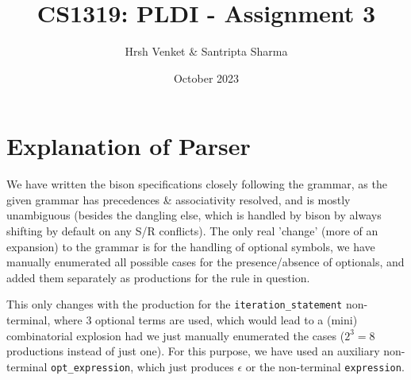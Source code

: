 \documentclass{article}
\title{CS1319: PLDI - Assignment 3}
\author{Hrsh Venket \& Santripta Sharma}
\date{October 2023}
\begin{document}
\maketitle 


\section*{Explanation of Parser}
We have written the bison specifications closely following the grammar, as the given grammar has precedences \& associativity resolved, and is mostly unambiguous (besides the dangling else, which is handled by bison by always shifting by default on any S/R conflicts). The only real 'change' (more of an expansion) to the grammar is for the handling of optional symbols, we have manually enumerated all possible cases for the presence/absence of optionals, and added them separately as productions for the rule in question.\bigskip

This only changes with the production for the \verb|iteration_statement| non-terminal, where 3 optional terms are used, which would lead to a (mini) combinatorial explosion had we just manually enumerated the cases ($2^3 = 8$ productions instead of just one). For this purpose, we have used an auxiliary non-terminal \verb|opt_expression|, which just produces $\epsilon$ or the non-terminal \verb|expression|.
\end{document}
